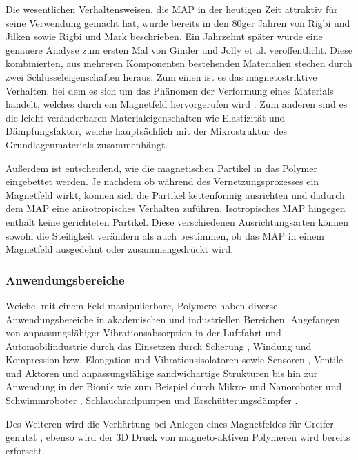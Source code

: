 Die wesentlichen Verhaltensweisen, die MAP in der heutigen Zeit attraktiv für seine Verwendung gemacht hat, wurde bereits in den 80ger Jahren von Rigbi und Jilken \cite{Rigbi1} sowie Rigbi und Mark \cite{Rigbi2} beschrieben. Ein Jahrzehnt später wurde eine genauere Analyse zum ersten Mal von Ginder und Jolly et al. \cite{ginder} veröffentlicht. 
Diese kombinierten, aus mehreren Komponenten bestehenden Materialien stechen durch zwei Schlüsseleigenschaften heraus. 
Zum einen ist es das magnetostriktive Verhalten, bei dem es sich um das Phänomen der Verformung eines Materials handelt, welches durch ein Magnetfeld hervorgerufen wird \cite{Martin_2006}.
Zum anderen sind es die leicht veränderbaren Materialeigenschaften wie Elastizität und Dämpfungsfaktor, welche hauptsächlich mit der Mikrostruktur des Grundlagenmaterials zusammenhängt. \cite{Varga1} \cite{Varga2}

Außerdem ist entscheidend, wie die magnetischen Partikel in das Polymer eingebettet werden. Je nachdem ob während des Vernetzungsprozesses ein Magnetfeld wirkt, können sich die Partikel kettenförmig ausrichten und dadurch dem MAP eine anisotropisches Verhalten zuführen. Isotropisches MAP hingegen enthält keine gerichteten Partikel. Diese verschiedenen Ausrichtungsarten können sowohl die Steifigkeit verändern als auch bestimmen, ob das MAP in einem Magnetfeld ausgedehnt oder zusammengedrückt wird. 
\subsubsection*{Anwendungsbereiche}
Weiche, mit einem Feld manipulierbare, Polymere haben diverse Anwendungsbereiche in akademischen und industriellen Bereichen. Angefangen von anpassungsfähiger Vibrationsabsorption in der Luftfahrt und Automobilindustrie durch das Einsetzen durch Scherung \cite{Ginder_Schlotter_Nichols} \cite{Deng_Gong}, Windung \cite{Hoang_Zhang_Li_Du} und Kompression bzw. Elongation \cite{Kallio_2007} und Vibrationsisolatoren \cite{Ginder_2000} sowie Sensoren \cite{Ginder_2000} \cite{Martin_2006}, Ventile und Aktoren \cite{Boese_2012} \cite{Keip_2014} und anpassungsfähige sandwichartige Strukturen \cite{Zhou_2005} \cite{Zhou_2006} \cite{Wei_2008} bis hin zur Anwendung in der Bionik wie zum Beispiel durch Mikro- und Nanoroboter und Schwimmroboter \cite{Qiu_2015} \cite{Xu_2015} \cite{Lum_2016} \cite{Hu_2018}, Schlauchradpumpen \cite{Fuhrer_2013} und Erschütterungsdämpfer \cite{Li_2013}.

Des Weiteren wird die Verhärtung bei Anlegen eines Magnetfeldes für Greifer genutzt \cite{Qi_2020}, ebenso wird der 3D Druck von magneto-aktiven Polymeren \cite{Sindersberger_2018} wird bereits erforscht.

